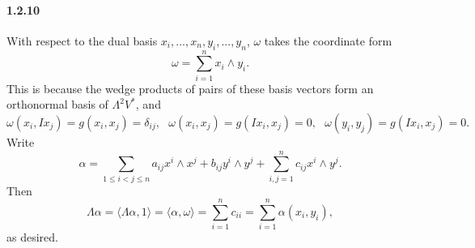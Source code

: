 \documentclass[10pt,letter]{article}
\begin{document}
\paragraph{1.2.10} With respect to the dual basis $x_i,...,x_n,y_i,...,y_n$, $\omega$ takes the coordinate form 
\[ \omega = \sum_{i=1}^n x_i \wedge y_i. \]
This is because the wedge products of pairs of these basis vectors form an orthonormal basis of $\Lambda^2 V^{\ast}$, and \[ \omega(x_i,Ix_j) = g(x_i,x_j) = \delta_{ij}, \ \ \  \omega(x_i,x_j) = g(Ix_i,x_j) = 0, \ \ \  \omega(y_i,y_j) = g(Ix_i,x_j) = 0.\] 
Write \[ \alpha = \sum_{1 \leq i < j \leq n} a_{ij} x^i \wedge x^j + b_{ij} y^i \wedge y^j + \sum_{i,j=1}^n c_{ij} x^i \wedge y^j.\]
Then
\[ \Lambda \alpha = \langle \Lambda \alpha, 1 \rangle = \langle \alpha, \omega \rangle = \sum_{i=1}^n c_{ii} = \sum_{i=1}^n \alpha(x_i,y_i),\]
as desired. 
\end{document}
